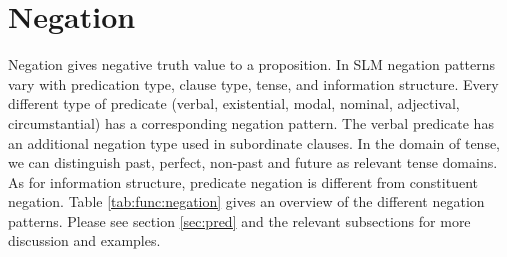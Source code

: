 %
%


\section{Negation}\label{sec:func:Negation}
Negation gives negative truth value to a proposition.
In SLM negation patterns vary with predication type, clause type, tense,  and information structure. Every different type of predicate (verbal, existential, modal, nominal, adjectival, circumstantial) has a corresponding negation pattern. The verbal predicate has an additional negation type used in subordinate clauses. In the domain of tense, we can distinguish past, perfect, non-past and future as relevant tense domains. As for information structure, predicate negation is different from constituent negation. Table \ref{tab:func:negation} gives an overview of the different negation patterns. Please see section \ref{sec:pred} and the relevant subsections for more discussion and examples.

